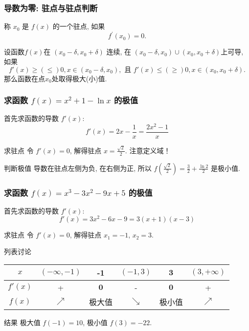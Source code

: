 \documentclass[
10pt,
aspectratio=43,
]{beamer}
\begin{document}
\begin{frame}
	\frametitle{导数为零: 驻点与驻点判断}
	\begin{block}{}
		称 $x_0$ 是 $f(x)$ 的一个驻点, 如果
		$$
			f^{\prime}\left(x_0\right)=0.
		$$
	\end{block}
	\begin{block}{}
		设函数$f(x)$在 $(x_0-\delta,x_0+\delta)$ 连续, 在 $(x_0-\delta,x_0)\cup(x_0,x_0+\delta)$上可导, 如果
		$$
			f'(x)\ge(\le)0, x\in(x_0-\delta,x_0),\,\,\text{且} \,\,f'(x)\le(\ge)0, x\in(x_0,x_0+\delta).
		$$
		那么函数在点$x_0$处取得极大(小)值.
	\end{block}
\end{frame}


\begin{frame}
	\frametitle{求函数 $f(x)=x^2+1-\ln x$ 的极值}
	\everymath{\displaystyle}
	\begin{block}{}
		首先求函数的导数 $f'(x)$:
		\[ f'(x) = 2x - \frac{1}{x} = \frac{2x^2 - 1}{x} \]
	\end{block}
	\pause
	\begin{block}{求驻点}
		令 $f'(x) = 0$, 解得驻点 $x = \frac{\sqrt{2}}{2}$. 注意定义域！
	\end{block}
	\pause
	\begin{block}{判断极值}
		导数在驻点左侧为负, 在右侧为正, 所以 $f\left(\frac{\sqrt{2}}{2}\right) = \frac{3}{2} + \frac{\ln 2}{2}$ 是极小值.
	\end{block}
\end{frame}

\begin{frame}
	\frametitle{求函数 $f(x)=x^3-3 x^2-9 x+5$ 的极值}
	\everymath{\displaystyle}
	\begin{block}{}
		首先求函数的导数 $f'(x)$:
		\[ f'(x) = 3x^2 - 6x - 9 = 3(x+1)(x-3) \]
	\end{block}
	\pause
	\begin{block}{求驻点}
		令 $f'(x) = 0$, 解得驻点 $x_1 = -1$, $x_2 = 3$.
	\end{block}
	\pause
	\begin{block}{列表讨论}
		\begin{tabular}{|c|c|c|c|c|c|}
			\hline
			$x$     & $(-\infty,-1)$ & -1           & $(-1,3)$   & $\mathbf{3}$ & $(3,+\infty)$ \\
			\hline
			$f'(x)$ & +              & $\mathbf{0}$ & -          & $\mathbf{0}$ & +             \\
			\hline
			$f(x)$  & $\nearrow$     & 极大值          & $\searrow$ & 极小值          & $\nearrow$    \\
			\hline
		\end{tabular}
	\end{block}
	\pause
	\begin{block}{结果}
		极大值 $f(-1) = 10$, 极小值 $f(3) = -22$.
	\end{block}
\end{frame}
\end{document}
